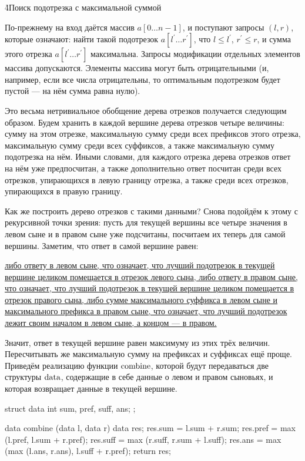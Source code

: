 \h4{Поиск подотрезка с максимальной суммой}

По-прежнему на вход даётся массив $a[0 \ldots n-1]$, и поступают запросы $(l,r)$, которые означают: найти такой подотрезок $a[l^\prime \ldots r^\prime]$, что $l \le l^\prime$, $r^\prime \le r$, и сумма этого отрезка $a[l^\prime \ldots r^\prime]$ максимальна. Запросы модификации отдельных элементов массива допускаются. Элементы массива могут быть отрицательными (и, например, если все числа отрицательны, то оптимальным подотрезком будет пустой --- на нём сумма равна нулю).

Это весьма нетривиальное обобщение дерева отрезков получается следующим образом. Будем хранить в каждой вершине дерева отрезков четыре величины: сумму на этом отрезке, максимальную сумму среди всех префиксов этого отрезка, максимальную сумму среди всех суффиксов, а также максимальную сумму подотрезка на нём. Иными словами, для каждого отрезка дерева отрезков ответ на нём уже предпосчитан, а также дополнительно ответ посчитан среди всех отрезков, упирающихся в левую границу отрезка, а также среди всех отрезков, упирающихся в правую границу.

Как же построить дерево отрезков с такими данными? Снова подойдём к этому с рекурсивной точки зрения: пусть для текущей вершины все четыре значения в левом сыне и в правом сыне уже подсчитаны, посчитаем их теперь для самой вершины. Заметим, что ответ в самой вершине равен:

\ul{
\li либо ответу в левом сыне, что означает, что лучший подотрезок в текущей вершине целиком помещается в отрезок левого сына,
\li либо ответу в правом сыне, что означает, что лучший подотрезок в текущей вершине целиком помещается в отрезок правого сына,
\li либо сумме максимального суффикса в левом сыне и максимального префикса в правом сыне, что означает, что лучший подотрезок лежит своим началом в левом сыне, а концом --- в правом.
}

Значит, ответ в текущей вершине равен максимуму из этих трёх величин. Пересчитывать же максимальную сумму на префиксах и суффиксах ещё проще. Приведём реализацию функции $\rm combine$, которой будут передаваться две структуры $\rm data$, содержащие в себе данные о левом и правом сыновьях, и которая возвращает данные в текущей вершине.

\code
struct data {
	int sum, pref, suff, ans;
};

data combine (data l, data r) {
	data res;
	res.sum = l.sum + r.sum;
	res.pref = max (l.pref, l.sum + r.pref);
	res.suff = max (r.suff, r.sum + l.suff);
	res.ans = max (max (l.ans, r.ans), l.suff + r.pref);
	return res;
}
\endcode

